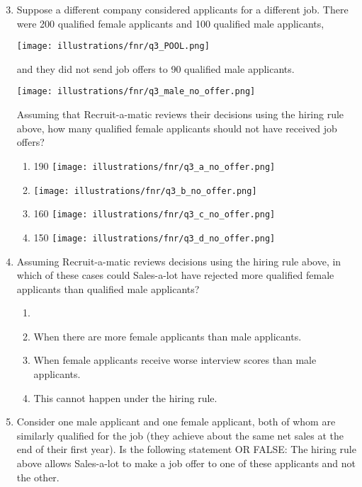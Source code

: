 \documentclass{article}
\newcommand{\correct}[1]{{\color{red}{#1}}}
\newcommand{\correct}[1]{{\color{red}{#1}}}
\begin{document}
\begin{enumerate}
\setcounter{enumi}{2}
    \item Suppose a different company considered applicants for a different job. There were 200 qualified female applicants and 100 qualified male applicants,

\texttt{[image: illustrations/fnr/q3\_POOL.png]}

and they did not send job offers to 90 qualified male applicants.

\texttt{[image: illustrations/fnr/q3\_male\_no\_offer.png]}

Assuming that Recruit-a-matic reviews their decisions using the hiring rule above, how many qualified female applicants should not have received job offers?
\begin{enumerate}
    \item 190
    \texttt{[image: illustrations/fnr/q3\_a\_no\_offer.png]}
    \item \correct{180}
    \texttt{[image: illustrations/fnr/q3\_b\_no\_offer.png]}
    \item 160
    \texttt{[image: illustrations/fnr/q3\_c\_no\_offer.png]}
    \item 150
    \texttt{[image: illustrations/fnr/q3\_d\_no\_offer.png]}
\end{enumerate}

\item Assuming Recruit-a-matic reviews decisions using the hiring rule above, in which of these cases could Sales-a-lot have rejected more qualified female applicants than qualified male applicants?

\begin{enumerate}
    \item \correct{When there are more qualified female applicants than qualified male applicants (i.e., more women had low net sales at the end of the year).}
    \item When there are more female applicants than male applicants.
    \item When female applicants receive worse interview scores than male applicants.
    \item This cannot happen under the hiring rule.
\end{enumerate}

\item Consider one male applicant and one female applicant, both of whom are similarly qualified for the job (they achieve about the same net sales at the end of their first year). Is the following statement \correct{TRUE} OR FALSE: The hiring rule above allows Sales-a-lot to make a job offer to one of these applicants and not the other.


\end{enumerate}
\end{document}

